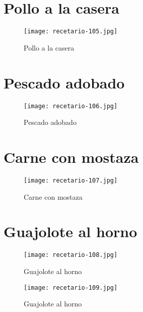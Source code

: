\documentclass[12pt,letterpaper]{article}
\begin{document}
\newpage

\section{Pollo a la casera}
  \begin{figure}[H]
    \vspace{2pt}
  \texttt{[image: recetario-105.jpg]}
    \caption{Pollo a la casera}
    
  \end{figure}

\newpage

\section{Pescado adobado}
  \begin{figure}[H]
    \vspace{2pt}
  \texttt{[image: recetario-106.jpg]}
    \caption{Pescado adobado}
    
  \end{figure}

\newpage

\section{Carne con mostaza}
  \begin{figure}[H]
    \vspace{2pt}
  \texttt{[image: recetario-107.jpg]}
    \caption{Carne con mostaza}
    
  \end{figure}

\newpage

\section{Guajolote al horno}
  \begin{figure}[H]
    \vspace{2pt}
  \texttt{[image: recetario-108.jpg]}
    \caption{Guajolote al horno}
    
  \end{figure}


\newpage

  \begin{figure}[H]
    \vspace{2pt}
  \texttt{[image: recetario-109.jpg]}
    \caption{Guajolote al horno}
    
  \end{figure}
\end{document}
